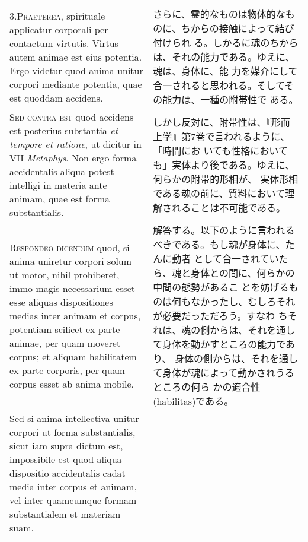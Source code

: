 \documentclass[paper=a4paper,fontsize=10pt,jafontsize=9pt,titlepage]{jlreq}
\begin{document}
\begin{longtable}{p{21em}p{21em}}
3.{\scshape Praeterea}, spirituale applicatur corporali per contactum
virtutis. Virtus autem animae est eius potentia. Ergo videtur quod
anima unitur corpori mediante potentia, quae est quoddam accidens.

&

 さらに、霊的なものは物体的なものに、ちからの接触によって結び付けられ
 る。しかるに魂のちからは、それの能力である。ゆえに、魂は、身体に、能
 力を媒介にして合一されると思われる。そしてその能力は、一種の附帯性で
 ある。
 
\\



{\scshape Sed contra est} quod accidens est posterius substantia
{\itshape et tempore et ratione}, ut dicitur in VII {\itshape
Metaphys}. Non ergo forma accidentalis aliqua potest intelligi in
materia ante animam, quae est forma substantialis.

&

 しかし反対に、附帯性は、『形而上学』第7巻で言われるように、「時間にお
 いても性格においても」実体より後である。ゆえに、何らかの附帯的形相が、
 実体形相である魂の前に、質料において理解されることは不可能である。
 
\\



 {\scshape Respondeo dicendum} quod, si anima uniretur corpori solum
 ut motor, nihil prohiberet, immo magis necessarium esset esse aliquas
 dispositiones medias inter animam et corpus, potentiam scilicet ex
 parte animae, per quam moveret corpus; et aliquam habilitatem ex
 parte corporis, per quam corpus esset ab anima mobile.

&

 解答する。以下のように言われるべきである。もし魂が身体に、たんに動者
 として合一されていたら、魂と身体との間に、何らかの中間の態勢があるこ
 とを妨げるものは何もなかったし、むしろそれが必要だっただろう。すなわ
 ちそれは、魂の側からは、それを通して身体を動かすところの能力であり、
 身体の側からは、それを通して身体が魂によって動かされうるところの何ら
 かの適合性(habilitas)である。
 
\\

 Sed si anima intellectiva unitur corpori ut forma substantialis,
 sicut iam supra dictum est, impossibile est quod aliqua dispositio
 accidentalis cadat media inter corpus et animam, vel inter quamcumque
 formam substantialem et materiam suam.
 
&


\end{longtable}
\end{document}
